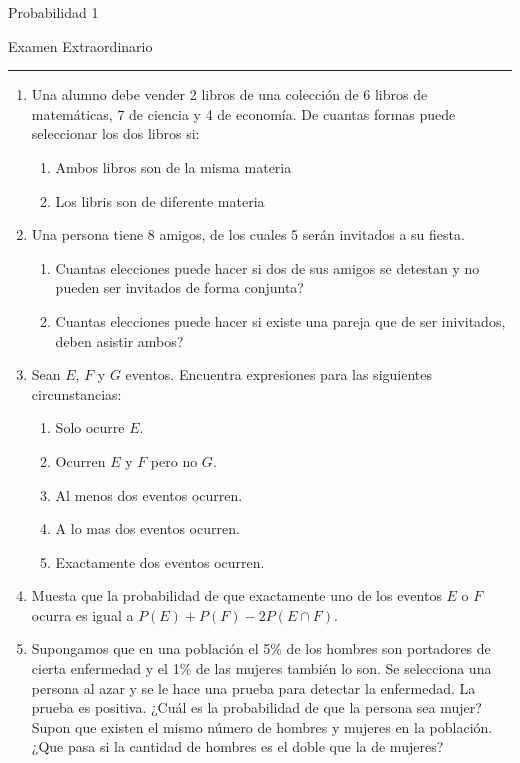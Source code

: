 \documentclass{report}
\begin{document}
\begin{center}
    \textsf{\Large Probabilidad 1}
    \par\medskip
    \textsf{\large Examen Extraordinario}
    \end{center}
    \hrule
    \par\bigskip

\begin{enumerate}
    \item Una alumno debe vender 2 libros de una colección de 6 libros de matemáticas, 7 de ciencia y 4 de economía. De cuantas formas puede seleccionar los dos libros si:
    \begin{enumerate}
        \item Ambos libros son de la misma materia
        \item Los libris son de diferente materia
    \end{enumerate}
    \item Una persona tiene 8 amigos, de los cuales 5 serán invitados a su fiesta. 
    \begin{enumerate}
        \item Cuantas elecciones puede hacer si dos de sus amigos se detestan y no pueden ser invitados de forma conjunta?
        \item Cuantas elecciones puede hacer si existe una pareja que de ser inivitados, deben asistir ambos?
    \end{enumerate}
    \item Sean $E$, $F$ y $G$ eventos. Encuentra expresiones para las siguientes circunstancias:
    \begin{enumerate}
        \item Solo ocurre $E$.
        \item Ocurren $E$ y $F$ pero no $G$.
        \item Al menos dos eventos ocurren.
        \item A lo mas dos eventos ocurren.
        \item Exactamente dos eventos ocurren.
    \end{enumerate}
    \item Muesta que la probabilidad de que exactamente uno de los eventos $E$ o $F$ ocurra es igual a $P(E)+P(F)-2P(E\cap F)$.
    \item Supongamos que en una población el 5\% de los hombres son portadores de cierta enfermedad y el 1\% de las mujeres también lo son. Se selecciona una persona al azar y se le hace una prueba para detectar la enfermedad. La prueba es positiva. ¿Cuál es la probabilidad de que la persona sea mujer? Supon que existen el mismo número de hombres y mujeres en la población. ¿Que pasa si la cantidad de hombres es el doble que la de mujeres?
    

\end{enumerate}
\end{document}
